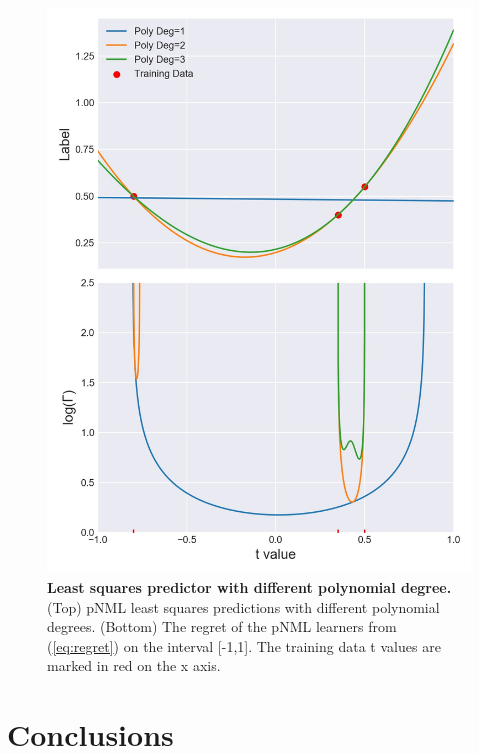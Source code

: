 \documentclass[conference,letterpaper]{IEEEtran}
\begin{document}
\begin{figure}[h]
    \centering
    \includegraphics[width=\linewidth]{figures/least_sqaures_with_poly_degree.jpg}
    \caption{\textbf{Least squares predictor with different polynomial degree.} (Top) pNML least squares predictions with different polynomial degrees. (Bottom) The regret of the pNML learners from (\ref{eq:regret}) on the interval [-1,1]. The training data t values are marked in red on the x axis.}
    \label{fig:least_squares_with_poly}
\end{figure}


\section{Conclusions} \label{sec:conclusion}
\end{document}
